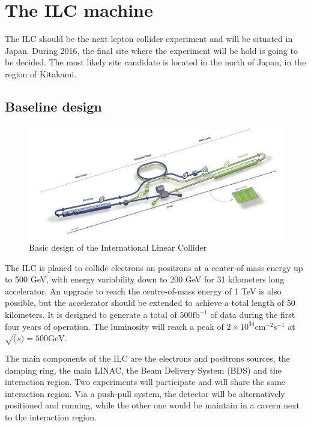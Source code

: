   \section{The ILC machine}
  
    The ILC should be the next lepton collider experiment and will be situated in Japan.
    During 2016, the final site where the experiment will be hold is going to be decided.
    The most likely site candidate is located in the north of Japan, in the region of Kitakami. 
    
    \subsection{Baseline design}

   \begin{figure}
      \centering
      \includegraphics[width = 15 cm]{Pictures/ILC}
      \caption{Basic design of the International Linear Collider}
      \label{fig:ILC}
    \end{figure}


    The ILC is planed to collide electrons an positrons at a center-of-mass energy up to 500 GeV, with energy variability down to 200 GeV for 31 kilometers long accelerator. 
    An upgrade to reach the centre-of-mass energy of 1 TeV is also possible, but the accelerator should be extended to achieve a total length of 50 kilometers.
    It is designed to generate a total of $500 \text{fb}^{-1}$ of data during the first four years of operation. The luminosity will reach a peak of $2 \times 10^{34}\text{cm}^{-2}\text{s}^{-1}$ at $\sqrt(s) = 500 \text{GeV}$.

    The main components of the ILC are the electrons and positrons sources, the damping ring, the main LINAC, the Beam Delivery System (BDS) and the interaction region. Two experiments will participate and will share the same interaction region. Via a push-pull system, the detector will be alternatively positioned and running, while the other one would be maintain in a cavern next to the interaction region. 

